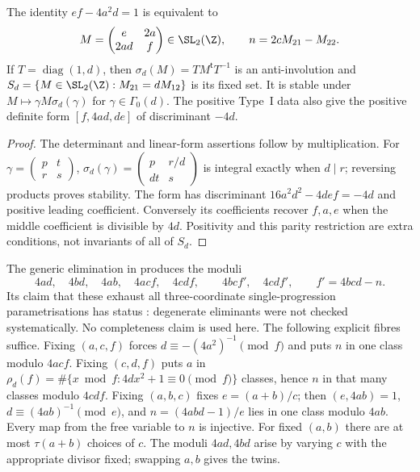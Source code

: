 \begin{lemma}\label{M:3.1}
The identity $ef-4a^2d=1$ is equivalent to
\[
 M=\begin{pmatrix}e&2a\\2ad&f\end{pmatrix}\in\SL_2(\Z),
 \qquad n=2cM_{21}-M_{22}.
\]
If $T=\operatorname{diag}(1,d)$, then
$\sigma_d(M)=TM^{\mathsf t}T^{-1}$ is an anti-involution and
$S_d=\{M\in\SL_2(\Z):M_{21}=dM_{12}\}$ is its fixed set.
It is stable under $M\mapsto\gamma M\sigma_d(\gamma)$ for
$\gamma\in\Gamma_0(d)$. The positive Type~I data also give the positive
definite form $[f,4ad,de]$ of discriminant $-4d$.
\end{lemma}
\begin{proof}
The determinant and linear-form assertions follow by multiplication.
For $\gamma=\left(\begin{smallmatrix}p&t\\r&s\end{smallmatrix}\right)$,
$\sigma_d(\gamma)=\left(\begin{smallmatrix}p&r/d\\dt&s\end{smallmatrix}\right)$
is integral exactly when $d\mid r$; reversing products proves stability.
The form has discriminant $16a^2d^2-4def=-4d$ and positive leading
coefficient. Conversely its coefficients recover $f,a,e$ when the middle
coefficient is divisible by $4d$. Positivity and this parity restriction
are extra conditions, not invariants of all of $S_d$.
\end{proof}

\begin{remark}\label{M:3.2}
The generic elimination in \cite[Lemma~3.2]{MN3} produces the moduli
\[
 4ad,\quad4bd,\quad4ab,\quad4acf,\quad4cdf,
 \qquad4bcf',\quad4cdf',\qquad f'=4bcd-n.
\]
Its claim that these exhaust all three-coordinate single-progression
parametrisations has status : degenerate eliminants were
not checked systematically. No completeness claim is used here. The
following explicit fibres suffice. Fixing $(a,c,f)$ forces
$d\equiv-(4a^2)^{-1}\pmod f$ and puts $n$ in one class modulo $4acf$.
Fixing $(c,d,f)$ puts $a$ in
$\rho_d(f)=\#\{x\bmod f:4dx^2+1\equiv0\pmod f\}$ classes, hence $n$ in
that many classes modulo $4cdf$. Fixing $(a,b,c)$ fixes $e=(a+b)/c$;
then $(e,4ab)=1$, $d\equiv(4ab)^{-1}\pmod e$, and
$n=(4abd-1)/e$ lies in one class modulo $4ab$.
Every map from the free variable to $n$ is injective. For fixed $(a,b)$
there are at most $\tau(a+b)$ choices of $c$. The moduli $4ad,4bd$ arise by
varying $c$ with the appropriate divisor fixed; swapping $a,b$ gives the twins.
\end{remark}

